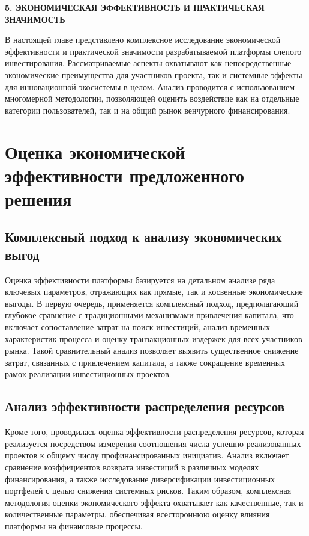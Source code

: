 \documentclass[
    candidate, %
    subf, %
    dotsinheaders=false,
]{disser}
\begin{document}
\newpage
\begin{center}
  \textbf{5. ЭКОНОМИЧЕСКАЯ ЭФФЕКТИВНОСТЬ И ПРАКТИЧЕСКАЯ ЗНАЧИМОСТЬ}
\end{center}

В настоящей главе представлено комплексное исследование экономической эффективности и практической значимости разрабатываемой платформы слепого инвестирования. Рассматриваемые аспекты охватывают как непосредственные экономические преимущества для участников проекта, так и системные эффекты для инновационной экосистемы в целом. Анализ проводится с использованием многомерной методологии, позволяющей оценить воздействие как на отдельные категории пользователей, так и на общий рынок венчурного финансирования.

\section{Оценка экономической эффективности предложенного решения}

\subsection{Комплексный подход к анализу экономических выгод}
Оценка эффективности платформы базируется на детальном анализе ряда ключевых параметров, отражающих как прямые, так и косвенные экономические выгоды. В первую очередь, применяется комплексный подход, предполагающий глубокое сравнение с традиционными механизмами привлечения капитала, что включает сопоставление затрат на поиск инвестиций, анализ временных характеристик процесса и оценку транзакционных издержек для всех участников рынка. Такой сравнительный анализ позволяет выявить существенное снижение затрат, связанных с привлечением капитала, а также сокращение временных рамок реализации инвестиционных проектов.

\subsection{Анализ эффективности распределения ресурсов}
Кроме того, проводилась оценка эффективности распределения ресурсов, которая реализуется посредством измерения соотношения числа успешно реализованных проектов к общему числу профинансированных инициатив. Анализ включает сравнение коэффициентов возврата инвестиций в различных моделях финансирования, а также исследование диверсификации инвестиционных портфелей с целью снижения системных рисков. Таким образом, комплексная методология оценки экономического эффекта охватывает как качественные, так и количественные параметры, обеспечивая всестороннюю оценку влияния платформы на финансовые процессы.
\end{document}
